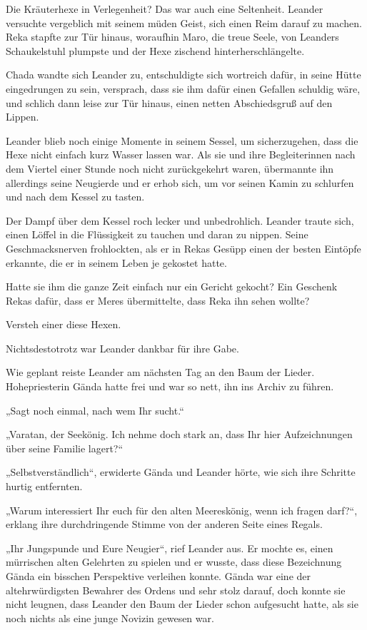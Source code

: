 Die Kräuterhexe in Verlegenheit? Das war auch eine Seltenheit. Leander versuchte vergeblich mit seinem müden Geist, sich einen Reim darauf zu machen. Reka stapfte zur Tür hinaus, woraufhin Maro, die treue Seele, von Leanders Schaukelstuhl plumpste und der Hexe zischend hinterherschlängelte.

Chada wandte sich Leander zu, entschuldigte sich wortreich dafür, in seine Hütte eingedrungen zu sein, versprach, dass sie ihm dafür einen Gefallen schuldig wäre, und schlich dann leise zur Tür hinaus, einen netten Abschiedsgruß auf den Lippen.

Leander blieb noch einige Momente in seinem Sessel, um sicherzugehen, dass die Hexe nicht einfach kurz Wasser lassen war. Als sie und ihre Begleiterinnen nach dem Viertel einer Stunde noch nicht zurückgekehrt waren, übermannte ihn allerdings seine Neugierde und er erhob sich, um vor seinen Kamin zu schlurfen und nach dem Kessel zu tasten.

Der Dampf über dem Kessel roch lecker und unbedrohlich. Leander traute sich, einen Löffel in die Flüssigkeit zu tauchen und daran zu nippen. Seine Geschmacksnerven frohlockten, als er in Rekas Gesüpp einen der besten Eintöpfe erkannte, die er in seinem Leben je gekostet hatte.

Hatte sie ihm die ganze Zeit einfach nur ein Gericht gekocht? Ein Geschenk Rekas dafür, dass er Meres übermittelte, dass Reka ihn sehen wollte?

Versteh einer diese Hexen.

Nichtsdestotrotz war Leander dankbar für ihre Gabe.



\trennzeichen



Wie geplant reiste Leander am nächsten Tag an den Baum der Lieder. Hohepriesterin Gända hatte frei und war so nett, ihn ins Archiv zu führen.

„Sagt noch einmal, nach wem Ihr sucht.“

„Varatan, der Seekönig. Ich nehme doch stark an, dass Ihr hier Aufzeichnungen über seine Familie lagert?“

„Selbstverständlich“, erwiderte Gända und Leander hörte, wie sich ihre Schritte hurtig entfernten.

„Warum interessiert Ihr euch für den alten Meereskönig, wenn ich fragen darf?“, erklang ihre durchdringende Stimme von der anderen Seite eines Regals.

„Ihr Jungspunde und Eure Neugier“, rief Leander aus. Er mochte es, einen mürrischen alten Gelehrten zu spielen und er wusste, dass diese Bezeichnung Gända ein bisschen Perspektive verleihen konnte. Gända war eine der altehrwürdigsten Bewahrer des Ordens und sehr stolz darauf, doch konnte sie nicht leugnen, dass Leander den Baum der Lieder schon aufgesucht hatte, als sie noch nichts als eine junge Novizin gewesen war.

